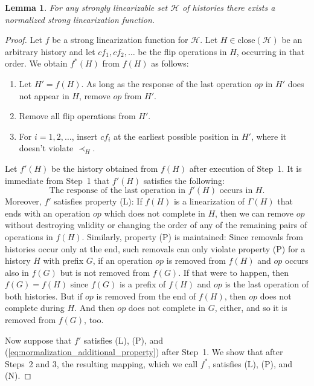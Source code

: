 \documentclass[11pt,letterpaper]{article}
\newtheorem{lemma}[theorem]{Lemma}
\newcommand{\HH}{\mathcal{H}}
\newcommand{\close}[1]{\ensuremath{\text{close}\left(#1\right)}}
\begin{document}
\begin{lemma}\label{lem:prefix-linearizable-normal-form}
For any strongly linearizable set $\HH$ of histories there exists a normalized strong linearization function.
\end{lemma}

\begin{proof}
 Let $f$ be a strong linearization function for $\HH$.
  Let $H\in\close{\HH}$ be an arbitrary history and let $cf_1,cf_2,\dots$ be the flip operations in $H$, occurring in that order.
  We obtain $f^\ast(H)$ from $f(H)$ as follows:
  \begin{enumerate}
   \item Let $H'=f(H)$.
   As long as the response of the last operation $op$ in $H'$ does not appear in $H$, remove $op$ from $H'$.
   \item Remove all flip operations from $H'$.
   \item For $i=1,2,\dots$, insert $cf_i$ at the earliest possible position in $H'$, where it doesn't violate $\prec_H$.
  \end{enumerate}

  Let $f'(H)$ be the history obtained from $f(H)$ after execution of Step~1.
  It is immediate from Step~1 that $f'(H)$ satisfies the following:
  \begin{equation}\label{eq:normalization_additional_property}
    \text{The response of the last operation in $f'(H)$ occurs in $H$.}\tag{$\ast$}
  \end{equation}
  Moreover, $f'$ satisfies property (L):
  If $f(H)$ is a linearization of $\Gamma(H)$ that ends with an operation $op$ which does not complete in $H$, then we can remove $op$ without destroying validity or changing the order of any of the remaining pairs of operations in $f(H)$.
  Similarly, property (P) is maintained:
  Since removals from histories occur only at the end, such removals can only violate property (P) for a history $H$ with prefix $G$, if an operation $op$ is removed from $f(H)$ and $op$ occurs also in $f(G)$ but is not removed from $f(G)$.
  If that were to happen, then $f(G)=f(H)$ since $f(G)$ is a prefix of $f(H)$ and $op$ is the last operation of both histories.
  But if $op$ is removed from the end of $f(H)$, then $op$ does not complete during $H$.
  And then $op$ does not complete in $G$, either, and so it is removed from $f(G)$, too.

  Now suppose that $f'$ satisfies (L), (P), and (\ref{eq:normalization_additional_property}) after Step~1.
  We show that after Steps~2 and 3, the resulting mapping, which we call $f^\ast$, satisfies (L), (P), and (N).


\end{proof}
\end{document}
